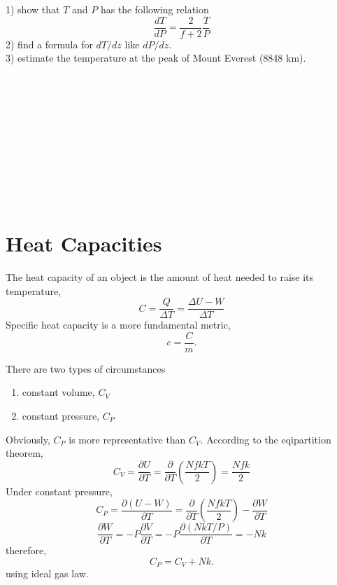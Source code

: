 1) show that $T$ and $P$ has the following relation
  \begin{equation} \frac{dT}{dP} = \frac{2}{f+2} \frac{T}{P} \end{equation}
2) find a formula for $dT/dz$ like $dP/dz$.\\
3) estimate the temperature at the peak of Mount Everest (8848 km).\\\\\\\\\\\\\\\\\\\\\

\section{Heat Capacities}
The heat capacity of an object is the amount of heat needed to raise its temperature,
  \begin{equation} C = \frac{Q}{\Delta{T}} = \frac{\Delta{U}-W}{\Delta{T}}\end{equation}
Specific heat capacity is a more fundamental metric,
  \begin{equation} c = \frac{C}{m}. \end{equation}

There are two types of circumstances
\begin{enumerate}
\item{constant volume}, $C_V$
\item{constant pressure}, $C_P$
\end{enumerate}
Obviously, $C_P$ is more representative than $C_V$.
According to the eqipartition theorem,
  \begin{equation} C_V = \frac{\partial U}{\partial{T}} 
                       = \frac{\partial} {\partial{T}}(\frac {NfkT}{2})
                       = \frac{Nfk}{2}
  \end{equation}
Under constant pressure,
  \begin{equation} C_P = \frac{\partial (U-W)} {\partial{T}} 
                       = \frac{\partial} {\partial{T}}(\frac {NfkT}{2}) - \frac{\partial W}{\partial{T}}
  \end{equation}
  \begin{equation}
                \frac{\partial W}{\partial{T}} = -P\frac{\partial V}{\partial T} 
                                                = -P\frac{\partial (NkT/P)}{\partial T} 
                                                = -Nk
  \end{equation}
therefore, 
  \begin{equation} C_P = C_V + Nk. \end{equation}
using ideal gas law.\\\\

